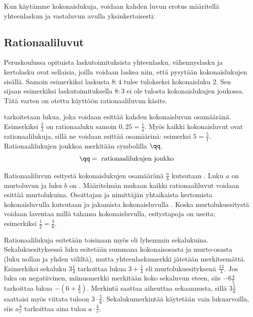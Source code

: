 %

Kun käytämme kokonaislukuja, voidaan kahden luvun erotus määritellä
yhteenlaskun ja vastaluvun avulla yksinkertaisesti:

\laatikko{
\[m-n = m+(-n)\]
}

\subsection*{Rationaaliluvut}

Peruskoulussa opituista laskutoimituksista yhteenlasku, vähennyslasku ja
kertolasku ovat sellaisia, joilla voidaan laskea niin, että pysytään kokonaislukujen
sisällä. Samoin esimerkiksi laskusta $8:4$ tulee tulokseksi kokonaisluku $2$.
Sen sijaan esimerkiksi laskutoimituksella $8:3$ ei ole tulosta kokonaislukujen joukossa.
Tätä varten on otettu käyttöön rationaaliluvun käsite.

 tarkoitetaan lukua, joka voidaan esittää
kahden kokonaisluvun osamääränä. Esimerkiksi $\frac{2}{3}$ on rationaaluku samoin $0,25=\frac{1}{4}$.
Myös kaikki kokonaisluvut ovat rationaalilukuja, sillä ne voidaan esittää osamäärinä:
esimerksi $5=\frac{5}{1}$. Rationaalilukujen joukkoa merkitään symbolilla $\qq$.
\[\qq= \text{ rationaalilukujen joukko} \]    

Rationaaliluvun esitystä kokonaislukujen osamääränä
$\frac{a}{b}$ kutsutaan . Luku $a$ on murtoluvun
 ja luku $b$ on
. Määritelmän mukaan kaikki rationaaliluvut
voidaan esittää murtolukuina. Osoittajan ja nimittäjän yhtaikaista kertomista kokonaisluvulla kutsutaan
 ja jakamista kokonaisluvulla .
Koska murtolukuesitystä voidaan laventaa millä tahansa kokonaisluvulla, esitystapoja on useita;
esimerkiksi $\frac{1}{2}=\frac{3}{6}$.

Rationaalilukuja esitetään toisinaan myös  eli lyhemmin
sekalukuina. Sekalukuesityksessä luku esitetään summana kokonaisosasta ja murto-osasta (luku nollan
ja yhden väliltä), mutta yhteenlaskumerkki jätetään merkitsemättä. Esimerkiksi sekaluku $3\frac{1}{4}$
tarkoittaa lukua $3 + \frac{1}{4}$ eli murtolukuesityksenä $\frac{13}{4}$. Jos luku on negatiivinen,
miinusmerkki merkitään koko sekaluvun eteen, siis $-6\frac{4}{5}$ tarkoittaa lukua $-(6 + \frac{4}{5})$.
Merkintä saattaa aiheuttaa sekaannusta, sillä $3\frac{5}{6}$ saattaisi myös viitata tuloon
$3\cdot \frac{5}{6}$. Sekalukumerkintää käytetään vain lukuarvoilla, siis $a\frac{b}{c}$ tarkoittaa aina
tuloa $a\cdot \frac{b}{c}$.

